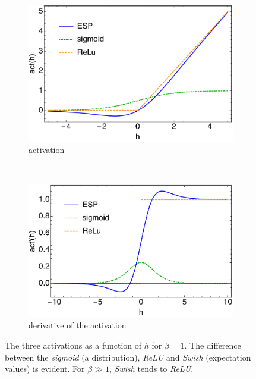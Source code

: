 \documentclass[5p]{elsarticle}
\begin{document}
\begin{figure}[t!]
    \centering
    \begin{subfigure}[b]{0.33 \textwidth}
        \includegraphics[width= \textwidth]{activations.pdf}
        \caption{activation}
        \label{fig:activation}
    \end{subfigure}
    ~
    \begin{subfigure}[b]{0.34 \textwidth}
        \includegraphics[width=\textwidth]{act.pdf}
        \caption{derivative of the activation}
        \label{fig:gradact}
    \end{subfigure}
\caption{\label{fig:activations} The three activations as a function of $h$ for $\beta=1$. The difference between the {\it sigmoid} (a distribution), {\it ReLU} and {\it Swish} (expectation values) is evident. For $\beta \gg 1$, {\it Swish} tends to {\it ReLU}.  }
\end{figure}
%
\end{document}

